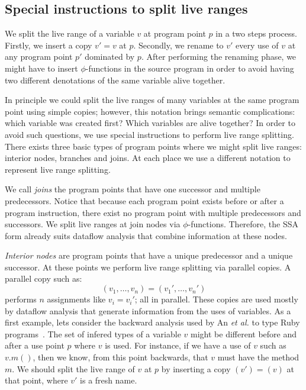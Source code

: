 \subsection{Special instructions to split live ranges}
\label{sub:ssi:instructions}

We split the live range of a variable $v$ at program point $p$ in a two steps
process.
Firstly, we insert a copy $v' = v$ at $p$.
Secondly, we rename to $v'$ every use of $v$ at any program point $p'$ dominated
by $p$.
After performing the renaming phase, we might have to insert $\phi$-functions in
the source program in order to avoid having two different denotations of the
same variable alive together.

In principle we could split the live ranges of many variables at the same
program point using simple copies; however, this notation brings semantic
complications: which variable was created first? Which variables are alive
together?
In order to avoid such questions, we use special instructions to perform
live range splitting.
There exists three basic types of program points where we might split live
ranges: interior nodes, branches and joins.
At each place we use a different notation to represent live range splitting.

We call {\em joins} the program points that have one successor and
multiple predecessors.
Notice that because each program point exists before or after a program
instruction, there exist no program point with multiple predecessors and
successors.
We split live ranges at join nodes via $\phi$-functions.
Therefore, the SSA form already suits dataflow analysis that combine information
at these nodes.

{\em Interior nodes} are program points that have a unique predecessor and a
unique successor.
At these points we perform live range splitting via parallel copies.
A parallel copy such as:
\[
(v_1, \ldots, v_n) = (v_1', \ldots, v_n')
\]
performs $n$ assignments like $v_i = v_i'$; all in parallel.
These copies are used mostly by dataflow analysis that generate information
from the uses of variables.
As a first example, lets consider the backward analysis used by An
{\em et al.} to type Ruby programs~\cite{An11}.
The set of infered types of a variable $v$ might be different before and after
a use point $p$ where $v$ is used.
For instance, if we have a use of $v$ such as $v.m()$, then we know, from this
point backwards, that $v$ must have the method $m$.
We should split the live range of $v$ at $p$ by inserting a copy $(v')=(v)$ at
that point, where $v'$ is a fresh name.

